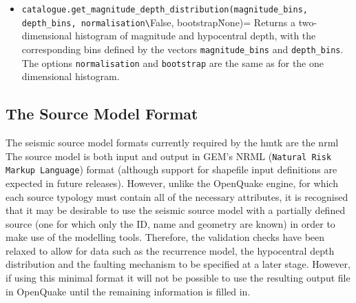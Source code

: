 \begin{itemize}
\begin{Verbatim}[frame=single, commandchars=\\\{\}, fontsize=\scriptsize, samepage=true]
# Import numpy and matplotlib
In [1]: import numpy as np
In [2]: import matplotlib.pyplot as plt

# Define depth bins for (e.g) 0. - 150 km in intervals of 10 km
In [3]: depth_bins = np.arange(0., 160., 10.)

# Get normalised histograms (without bootstrapping)
In [4]: depth_hist = catalogue.get_depth_distribution(depth_bins, normalisation=True)

# Create a simple histogram plot
In [5]: plt.bar(depth_bins[:-1], depth_hist, width=10.)

# Add some labels
In [6]: plt.xlabel('Depth (km)')
In [7]: plt.ylabel('Density')
\end{Verbatim}


\item \verb=catalogue.get_magnitude_depth_distribution(magnitude_bins, depth_bins, normalisation\=False, bootstrap\=None)= Returns a two-dimensional histogram of magnitude and hypocentral depth, with the corresponding bins defined by the vectors \verb=magnitude_bins= and \verb=depth_bins=. The options \verb=normalisation= and \verb=bootstrap= are the same as for the one dimensional histogram.

\end{itemize}



\subsection{The Source Model Format}

The seismic source model formats currently required by the hmtk are the nrml  The source model is both input and output in GEM's NRML (\verb=Natural Risk Markup Language=) format (although support for shapefile input definitions are expected in future releases). However, unlike the OpenQuake engine, for which each source typology must contain all of the necessary attributes, it is recognised that it may be desirable to use the seismic source model with a partially defined source (one for which only the ID, name and geometry are known) in order to make use of the modelling tools. Therefore, the validation checks have been relaxed to allow for data such as the recurrence model, the hypocentral depth distribution and the faulting mechanism to be specified at a later stage. However, if using this minimal format it will not be possible to use the resulting output file in OpenQuake until the remaining information is filled in.  

